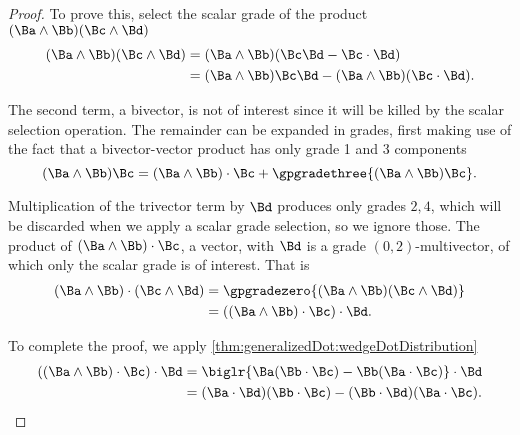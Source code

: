 \begin{proof}
To prove this, select the scalar grade of the product \( (\Ba \wedge \Bb) (\Bc \wedge \Bd) \)
\begin{equation}\label{eqn:generalizedDot_bivectorDot:1160}
\begin{aligned}
(\Ba \wedge \Bb) (\Bc \wedge \Bd)
&= (\Ba \wedge \Bb) (\Bc \Bd - \Bc \cdot \Bd) \\
&= (\Ba \wedge \Bb) \Bc \Bd - (\Ba \wedge \Bb) (\Bc \cdot \Bd).
\end{aligned}
\end{equation}

The second term, a bivector, is not of interest since it will be killed by the scalar selection operation.
The remainder can be expanded in grades, first making use of the fact that a bivector-vector product has only
grade 1 and 3 components
\begin{equation}\label{eqn:generalizedDot_bivectorDot:1180}
(\Ba \wedge \Bb) \Bc
=
(\Ba \wedge \Bb) \cdot \Bc
+ \gpgradethree{ (\Ba \wedge \Bb) \Bc }.
\end{equation}

Multiplication of the trivector term by \( \Bd \) produces only grades \(2,4\), which will be discarded when we apply a scalar grade selection, so we ignore those.
The product
of \( (\Ba \wedge \Bb) \cdot \Bc \), a vector, with \( \Bd \) is a grade \((0,2)\)-multivector, of which only the scalar grade is of interest.
That is
\begin{equation}\label{eqn:generalizedDot_bivectorDot:1220}
\begin{aligned}
(\Ba \wedge \Bb) \cdot (\Bc \wedge \Bd)
&= \gpgradezero{ (\Ba \wedge \Bb) (\Bc \wedge \Bd) } \\
&= ((\Ba \wedge \Bb) \cdot \Bc )\cdot \Bd.
\end{aligned}
\end{equation}

To complete the proof, we apply \cref{thm:generalizedDot:wedgeDotDistribution}
\begin{equation}\label{eqn:generalizedDot_bivectorDot:1240}
\begin{aligned}
((\Ba \wedge \Bb) \cdot \Bc )\cdot \Bd
&= \biglr{ \Ba (\Bb \cdot \Bc) - \Bb (\Ba \cdot \Bc) } \cdot \Bd \\
&= (\Ba \cdot \Bd) (\Bb \cdot \Bc) - (\Bb \cdot \Bd) (\Ba \cdot \Bc).
\end{aligned}
\end{equation}
\end{proof}

